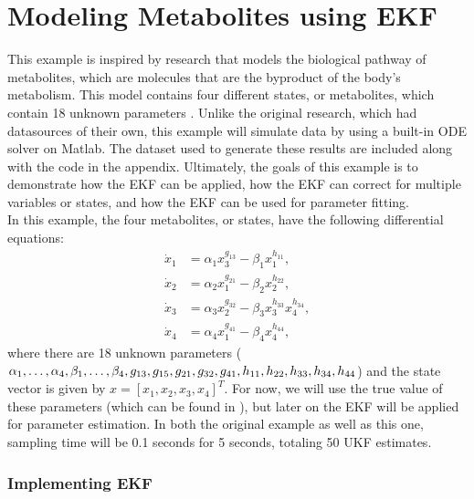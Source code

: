 \section{Modeling Metabolites using EKF}
\label{Modeling Metabolites using EKF}
\label{chap:EKF_Meskin}

\noindent This example is inspired by research that models the biological pathway of metabolites, which are molecules that are the byproduct of the body's metabolism. This model contains four different states, or metabolites, which contain 18 unknown parameters \cite{article5}. Unlike the original research, which had datasources of their own, this example will simulate data by using a built-in ODE solver on Matlab. The dataset used to generate these results are included along with the code in the appendix. Ultimately, the goals of this example is to demonstrate how the EKF can be applied, how the EKF can correct for multiple variables or states, and how the EKF can be used for parameter fitting. \\ 

\noindent In this example, the four metabolites, or states, have the following differential equations:
\begin{align*}
\dot x_1 &= \alpha_1 x_3^{g_{13}}  - \beta_1 x_1^{h_{11}}, \\
\dot x_2 &= \alpha_2 x_1^{g_{21}} - \beta_2 x_2^{h_{22}}, \\
\dot x_3 &= \alpha_3 x_2^{g_{32}} - \beta_3 x_3^{h_{33}} x_4^{h_{34}}, \\
\dot x_4 &= \alpha_4  x_1^{g_{41}} - \beta_4 x_4^{h_{44}},
\end{align*}
where there are 18 unknown parameters ($\alpha_1, \hdots, \alpha_4, \beta_1, \hdots, \beta_4, g_{13}, g_{15}, g_{21}, \\ g_{32}, g_{41}, h_{11}, h_{22}, h_{33}, h_{34}, h_{44} $) and the state vector is given by $x= [x_{1}, x_{2}, x_{3}, x_{4}]^T$. For now, we will use the true value of these parameters (which can be found in \cite{article5}), but later on the EKF will be applied for parameter estimation. In both the original example as well as this one, sampling time will be 0.1 seconds for 5 seconds, totaling 50 UKF estimates. \\



\clearpage
\subsubsection{Implementing EKF}

